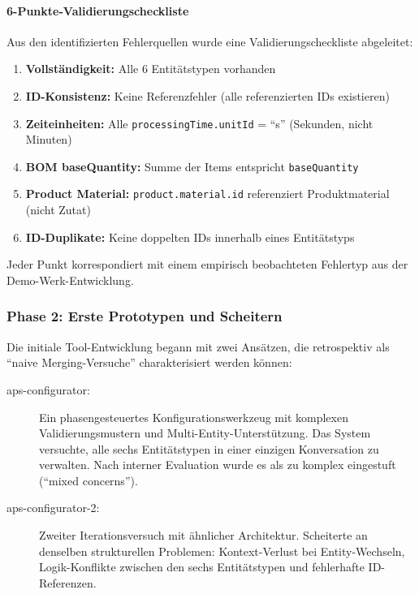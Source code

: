 \paragraph{6-Punkte-Validierungscheckliste}

Aus den identifizierten Fehlerquellen wurde eine Validierungscheckliste abgeleitet:

\begin{enumerate}
    \item \textbf{Vollständigkeit:} Alle 6 Entitätstypen vorhanden
    \item \textbf{ID-Konsistenz:} Keine Referenzfehler (alle referenzierten IDs existieren)
    \item \textbf{Zeiteinheiten:} Alle \texttt{processingTime.unitId} = ``s'' (Sekunden, nicht Minuten)
    \item \textbf{BOM baseQuantity:} Summe der Items entspricht \texttt{baseQuantity}
    \item \textbf{Product Material:} \texttt{product.material.id} referenziert Produktmaterial (nicht Zutat)
    \item \textbf{ID-Duplikate:} Keine doppelten IDs innerhalb eines Entitätstyps
\end{enumerate}

Jeder Punkt korrespondiert mit einem empirisch beobachteten Fehlertyp aus der Demo-Werk-Entwicklung.


\subsubsection{Phase 2: Erste Prototypen und Scheitern}
\label{subsubsec:Phase2}

Die initiale Tool-Entwicklung begann mit zwei Ansätzen, die retrospektiv als ``naive Merging-Versuche'' charakterisiert werden können:

\begin{description}
    \item[aps-configurator:] Ein phasengesteuertes Konfigurationswerkzeug mit komplexen Validierungsmustern und Multi-Entity-Unterstützung. Das System versuchte, alle sechs Entitätstypen in einer einzigen Konversation zu verwalten. Nach interner Evaluation wurde es als zu komplex eingestuft (``mixed concerns'').

    \item[aps-configurator-2:] Zweiter Iterationsversuch mit ähnlicher Architektur. Scheiterte an denselben strukturellen Problemen: Kontext-Verlust bei Entity-Wechseln, Logik-Konflikte zwischen den sechs Entitätstypen und fehlerhafte ID-Referenzen.
\end{description}

